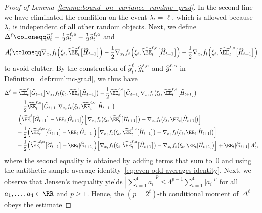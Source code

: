 \documentclass[11pt]{article}
\let\hat\widehat
\begin{document}
\begin{proof}[Proof of Lemma~\ref{lemma:bound_on_variance_rumlmc_grad}]
In the second line we have eliminated the condition on the event $\lambda_t=\ell$, which is allowed because $\lambda_t$ is independent of all other random objects. Next, we define $\Delta^\ell \coloneqq \hat{g}_t^{\ell}-\frac{1}{2}\hat{g}_t^{\ell, {\rm e}} - \frac{1}{2} \hat{g}_t^{\ell, {\rm o}}$ and
\begin{align*}
    A_t^\ell \coloneqq \nabla_{x_t} f_t \Big(\xi_t, \hat\EE_t^{\ell}\big[\hat{H}_{t+1}\big]\Big) 
    -\frac{1}{2}\nabla_{x_t} f_t \Big(\xi_t, \hat\EE_t^{\ell, {\rm e}}\big[\hat{H}_{t+1}\big]\Big) -\frac{1}{2}\nabla_{x_t} f_t \Big(\xi_t, \hat\EE_t^{\ell, {\rm o}}\big[\hat{H}_{t+1}\big]\Big)
\end{align*}
to avoid clutter. By the construction of $\hat g_t^\ell$, $\hat{g}_t^{\ell, {\rm e}}$ and $\hat{g}_t^{\ell, {\rm o}}$ in Definition~\ref{def:rumlmc-grad}, we thus have
\begin{align*}
    \Delta^\ell 
    & = \hat\EE_t^{\ell}\big[\hat{G}_{t+1}\big]  \nabla_{x_t} f_t \big(\xi_t, \hat\EE_t^{\ell}\big[\hat{H}_{t+1}\big]\big)-\frac{1}{2} \hat\EE_t^{\ell, {\rm e}}\big[\hat{G}_{t+1}\big]  \nabla_{x_t} f_t \big(\xi_t, \hat\EE_t^{\ell, {\rm e}}\big[\hat{H}_{t+1}\big]\big) \\
    & \quad -\frac{1}{2} \hat\EE_t^{\ell, {\rm o}}\big[\hat{G}_{t+1}\big] \nabla_{x_t} f_t \big(\xi_t, \hat\EE_t^{\ell, {\rm o}}\big[\hat{H}_{t+1}\big]\big) \\ 
    & = \Big( \hat\EE_t^{\ell}\big[\hat{G}_{t+1}\big] -\EE_t[\hat{G}_{t+1}] \Big) \Big[\nabla_{x_t} f_t \big(\xi_t, \hat\EE_t^{\ell}\big[\hat{H}_{t+1}\big]\big) - \nabla_{x_t} f_t\big(\xi_t, \EE_t[\hat{H}_{t+1}] \big)\Big] \\
    & \quad -\frac{1}{2}\Big( \hat\EE_t^{\ell, {\rm e}}\big[\hat{G}_{t+1}\big] -\EE_t[\hat{G}_{t+1}] \Big) \Big[\nabla_{x_t} f_t \big(\xi_t, \hat\EE_t^{\ell, {\rm e}}\big[\hat{H}_{t+1}\big]\big) - \nabla_{x_t} f_t\big(\xi_t, \EE_t[\hat{H}_{t+1}] \big)\Big] \\
    & \quad - \frac{1}{2}\Big( \hat\EE_t^{\ell, {\rm o}}\big[\hat{G}_{t+1}\big] -\EE_t[\hat{G}_{t+1}] \Big) \Big[ \nabla_{x_t} f_t \big(\xi_t, \hat\EE_t^{\ell, {\rm o}}\big[\hat{H}_{t+1}\big]\big) - \nabla_{x_t} f_t\big(\xi_t, \EE_t[\hat{H}_{t+1}] \big)\Big] +\EE_t[\hat{G}_{t+1}] \, A_t^\ell,
\end{align*}
where the second equality is obtained by adding terms that sum to~$0$ and using the antithetic sample average identity~\eqref{eq:even-odd-averages-identity}. Next, we observe that Jensen's inequality yields $|\sum_{i=1}^4 a_i |^p \leq 4^{p-1} \sum_{i=1}^4  |a_i |^p$ for all $a_1,\ldots, a_4\in\RR$ and $p\geq 1$. Hence, the $(p=2^t)$-th conditional moment of~$\Delta^\ell$ obeys the estimate

\end{proof}
\end{document}
